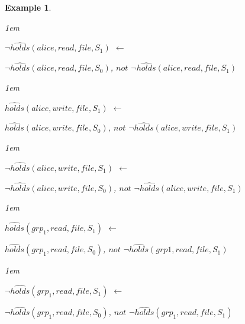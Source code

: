\documentclass[11pt]{report}
\newtheorem{vexample}{Example}[chapter]
\newenvironment{vquote}
{
  \begin{list}{}{\leftmargin 1em}\item[]
}
{
  \end{list}
}
\begin{document}
\begin{vexample}
\begin{enumerate}
              \begin{vquote}
                $\lnot\hat{holds}(alice, read, file, S_{1})$ $\leftarrow$

                \hspace{1em}
                $\lnot\hat{holds}(alice, read, file, S_{0})$,
                $not$ $\lnot\hat{holds}(alice, read, file, S_{1})$
              \end{vquote}

              \begin{vquote}
                $\hat{holds}(alice, write, file, S_{1})$ $\leftarrow$

                \hspace{1em}
                $\hat{holds}(alice, write, file, S_{0})$,
                $not$ $\lnot\hat{holds}(alice, write, file, S_{1})$
              \end{vquote}

              \begin{vquote}
                $\lnot\hat{holds}(alice, write, file, S_{1})$ $\leftarrow$

                \hspace{1em}
                $\lnot\hat{holds}(alice, write, file, S_{0})$,
                $not$ $\lnot\hat{holds}(alice, write, file, S_{1})$
              \end{vquote}

              \begin{vquote}
                $\hat{holds}(grp_1, read, file, S_{1})$ $\leftarrow$

                \hspace{1em}
                $\hat{holds}(grp_1, read, file, S_{0})$,
                $not$ $\lnot\hat{holds}(grp1, read, file, S_{1})$
              \end{vquote}

              \begin{vquote}
                $\lnot\hat{holds}(grp_1, read, file, S_{1})$ $\leftarrow$

                \hspace{1em}
                $\lnot\hat{holds}(grp_1, read, file, S_{0})$,
                $not$ $\lnot\hat{holds}(grp_1, read, file, S_{1})$
              \end{vquote}


\end{enumerate}
\end{vexample}
\end{document}
